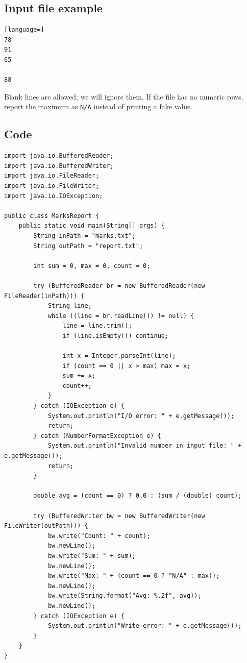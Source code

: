 \documentclass[11pt]{article}
\begin{document}
\subsection*{Input file example}
\begin{lstlisting}[language=]
78
91
65

88
\end{lstlisting}
Blank lines are allowed; we will ignore them. If the file has no numeric rows, report the maximum as \texttt{N/A} instead of printing a fake value.

\subsection*{Code}
\begin{lstlisting}
import java.io.BufferedReader;
import java.io.BufferedWriter;
import java.io.FileReader;
import java.io.FileWriter;
import java.io.IOException;

public class MarksReport {
    public static void main(String[] args) {
        String inPath = "marks.txt";
        String outPath = "report.txt";

        int sum = 0, max = 0, count = 0;

        try (BufferedReader br = new BufferedReader(new FileReader(inPath))) {
            String line;
            while ((line = br.readLine()) != null) {
                line = line.trim();
                if (line.isEmpty()) continue;

                int x = Integer.parseInt(line);
                if (count == 0 || x > max) max = x;
                sum += x;
                count++;
            }
        } catch (IOException e) {
            System.out.println("I/O error: " + e.getMessage());
            return;
        } catch (NumberFormatException e) {
            System.out.println("Invalid number in input file: " + e.getMessage());
            return;
        }

        double avg = (count == 0) ? 0.0 : (sum / (double) count);

        try (BufferedWriter bw = new BufferedWriter(new FileWriter(outPath))) {
            bw.write("Count: " + count);
            bw.newLine();
            bw.write("Sum: " + sum);
            bw.newLine();
            bw.write("Max: " + (count == 0 ? "N/A" : max));
            bw.newLine();
            bw.write(String.format("Avg: %.2f", avg));
            bw.newLine();
        } catch (IOException e) {
            System.out.println("Write error: " + e.getMessage());
        }
    }
}
\end{lstlisting}
\end{document}
